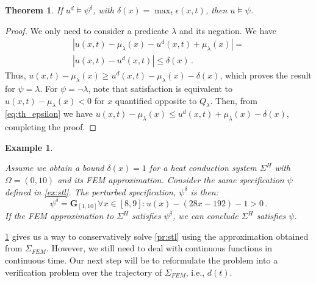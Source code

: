 \documentclass[letterpaper, 10 pt, conference]{ieeeconf/ieeeconf}
\newtheorem{theorem}{Theorem}
\newtheorem{example}{Example}
\newcommand{\Always}{\mathbf{G}}
\begin{document}
\begin{theorem}
\label{th:epsilon_approximation}
    If $u^d \models \psi^{\delta}$, with $\delta(x) = \max_t \epsilon(x, t)$, then $u \models \psi$.
\end{theorem}
\begin{proof}
    We only need to consider a predicate $\lambda$ and its negation. We have
    \begin{multline}
        \label{eq:th_epsilon}
         |u(x, t) - \mu_\lambda(x) - u^d(x, t) + \mu_\lambda(x)| = \\
         |u(x, t) - u^d(x, t)| \leq \delta(x) \,.
    \end{multline}
    Thus, $u(x, t) - \mu_\lambda(x) \geq u^d(x, t) -
    \mu_\lambda(x) - \delta(x)$, which proves the result for $\psi = \lambda$. For $\psi
    = \lnot \lambda$, note that satisfaction is equivalent to $u(x, t) -
    \mu_\lambda(x) < 0$ for $x$ quantified opposite to $Q_\lambda$. Then, from
    \cref{eq:th_epsilon} we have $u(x, t) - \mu_\lambda(x) \leq u^d(x, t) +
    \mu_\lambda(x) - \delta(x)$, completing the proof.
\end{proof}

\begin{example}
    \label{ex:eps_approx}

    Assume we obtain a bound $\delta(x) = 1$ for a heat conduction system
    $\Sigma^H$ with $\Omega = (0, 10)$ and its
    FEM approximation. Consider the same specification $\psi$ defined in \cref{ex:stl}.
    The perturbed specification, $\psi^\delta$ is then:
    \begin{equation}
        \psi^\delta = \Always_{[1,10]} \forall x \in [8,9] : u(x) - (28x -
        192) - 1 > 0 \,.
    \end{equation}
    If the FEM approximation to $\Sigma^H$ satisfies $\psi^\delta$, we can
    conclude $\Sigma^H$ satisfies $\psi$.
    
\end{example}

\cref{th:epsilon_approximation} gives us a way to conservatively solve
\cref{pr:stl} using the approximation obtained from $\Sigma_{FEM}$.
However, we still need to deal with continuous functions in continuous time. Our
next step will be to reformulate the problem into a verification problem over
the trajectory of $\Sigma_{FEM}$, i.e., $d(t)$.
\end{document}
